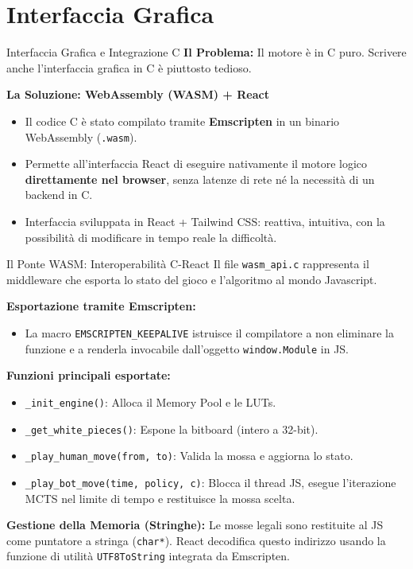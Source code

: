 \documentclass[10pt]{beamer}
\begin{document}
\section{Interfaccia Grafica}
\begin{frame}{Interfaccia Grafica e Integrazione C}
    \textbf{Il Problema:} Il motore è in C puro. Scrivere anche l'interfaccia grafica in C è piuttosto tedioso.
    
    \vspace{0.3cm}
    \textbf{La Soluzione: WebAssembly (WASM) + React}
    \begin{itemize}
        \item Il codice C è stato compilato tramite \textbf{Emscripten} in un binario WebAssembly (\texttt{.wasm}).
        \item Permette all'interfaccia React di eseguire nativamente il motore logico \textbf{direttamente nel browser}, senza latenze di rete né la necessità di un backend in C.
        \item Interfaccia sviluppata in React + Tailwind CSS: reattiva, intuitiva, con la possibilità di modificare in tempo reale la difficoltà.
    \end{itemize}
\end{frame}

\begin{frame}{Il Ponte WASM: Interoperabilità C-React}
    Il file \texttt{wasm\_api.c} rappresenta il middleware che esporta lo stato del gioco e l'algoritmo al mondo Javascript.
    
    \vspace{0.3cm}
    \textbf{Esportazione tramite Emscripten:}
    \begin{itemize}
        \item La macro \texttt{EMSCRIPTEN\_KEEPALIVE} istruisce il compilatore a non eliminare la funzione e a renderla invocabile dall'oggetto \texttt{window.Module} in JS.
    \end{itemize}
    
    \textbf{Funzioni principali esportate:}
    \begin{itemize}
        \item \texttt{\_init\_engine()}: Alloca il Memory Pool e le LUTs.
        \item \texttt{\_get\_white\_pieces()}: Espone la bitboard (intero a 32-bit).
        \item \texttt{\_play\_human\_move(from, to)}: Valida la mossa e aggiorna lo stato.
        \item \texttt{\_play\_bot\_move(time, policy, c)}: Blocca il thread JS, esegue l'iterazione MCTS nel limite di tempo e restituisce la mossa scelta.
    \end{itemize}
    
    \textbf{Gestione della Memoria (Stringhe):} Le mosse legali sono restituite al JS come puntatore a stringa (\texttt{char*}). React decodifica questo indirizzo usando la funzione di utilità \texttt{UTF8ToString} integrata da Emscripten.
\end{frame}
\end{document}
